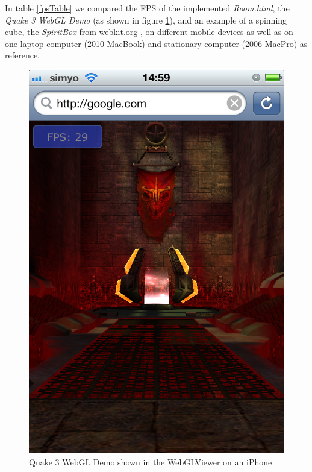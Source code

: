 \documentclass[12pt,journal,compsoc]{IEEEtran}
\begin{document}
In table \ref{fpsTable} we compared the FPS of the implemented \textit{Room.html}, the \textit{Quake 3 WebGL Demo} \cite{quakewebgl} (as shown in figure \ref{fig:quake3}), and an example of a spinning cube, the \textit{SpiritBox} from \url {webkit.org} \cite{SpiritBox}, on different mobile devices as well as on one laptop computer (2010 MacBook) and stationary computer (2006 MacPro) as reference. 

\begin{figure}[htb]
	\centerline{\includegraphics[width=0.8\columnwidth]{grafiken/quake3}}
	\caption{Quake 3 WebGL Demo \cite{quakewebgl} shown in the WebGLViewer on an iPhone}
	\label{fig:quake3}
\end{figure}
\end{document}
